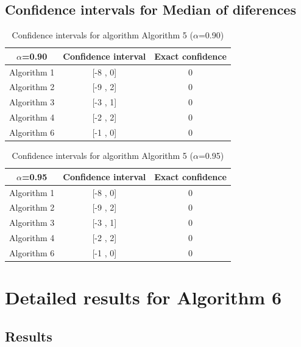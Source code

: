 \documentclass[a4paper,10pt]{article}
\begin{document}
\subsection{Confidence intervals for Median of diferences}

\begin{table}[!htp]
\centering\small
\begin{tabular}{
|c|c|c|}
\hline
 $\alpha$=0.90 & Confidence interval & Exact confidence \\ \hline 
Algorithm 1 & [-8 , 0] & 0\\ \hline 
Algorithm 2 & [-9 , 2] & 0\\ \hline 
Algorithm 3 & [-3 , 1] & 0\\ \hline 
Algorithm 4 & [-2 , 2] & 0\\ \hline 
Algorithm 6 & [-1 , 0] & 0\\ \hline 

\end{tabular}
\caption{Confidence intervals for algorithm Algorithm 5 ($\alpha$=0.90)}
\end{table}
\begin{table}[!htp]
\centering\small
\begin{tabular}{
|c|c|c|}
\hline
 $\alpha$=0.95 & Confidence interval & Exact confidence \\ \hline 
Algorithm 1 & [-8 , 0] & 0\\ \hline 
Algorithm 2 & [-9 , 2] & 0\\ \hline 
Algorithm 3 & [-3 , 1] & 0\\ \hline 
Algorithm 4 & [-2 , 2] & 0\\ \hline 
Algorithm 6 & [-1 , 0] & 0\\ \hline 

\end{tabular}
\caption{Confidence intervals for algorithm Algorithm 5 ($\alpha$=0.95)}
\end{table}

 \clearpage 


\section{Detailed results for Algorithm 6}


\subsection{Results}
\end{document}

